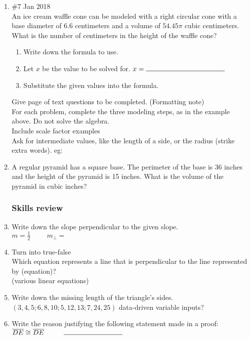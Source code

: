 \documentclass[12pt, twoside]{article}
\begin{document}
\begin{enumerate}
    \item \#7 Jan 2018\\
    An ice cream waffle cone can be modeled with a right circular
    cone with a base diameter of 6.6 centimeters and a volume of $54.45 \pi$ cubic centimeters. What is the number of centimeters in the height of the waffle cone?
      \begin{enumerate}
        \item Write down the formula to use.
        \item Let $x$ be the value to be solved for. $x= \rule{4cm}{0.15mm}$
        \item Substitute the given values into the formula.
      \end{enumerate}

    Give page of text questions to be completed. (Formatting note)\\
    For each problem, complete the three modeling steps, as in the example above. Do not solve the algebra.\\
    Include scale factor examples\\
    Ask for intermediate values, like the length of a side, or the radius (strike extra words). eg:
    \item A regular pyramid has a square base. The perimeter of the base is 36 inches and the height of the pyramid is 15 inches. What is the volume of the pyramid in cubic inches?

    \subsubsection*{Skills review}
    \item Write down the slope perpendicular to the given slope.\\
    $m=\frac{1}{2} \hspace{1cm} m_{\perp} = $

    \item Turn into true-false\\
    Which equation represents a line that is perpendicular to the line represented by (equation)?\\
    (various linear equations)

    \item Write down the missing length of the triangle’s sides.
    $(3,4,5; 6,8,10; 5,12,13; 7, 24, 25)$ data-driven variable inputs?

    \item Write the reason justifying the following statement made in a proof:\\[0.5cm]
    $\overline{DE} \cong \overline{DE} \hspace{1cm} \rule{3cm}{0.015cm}$


\end{enumerate}
\end{document}
